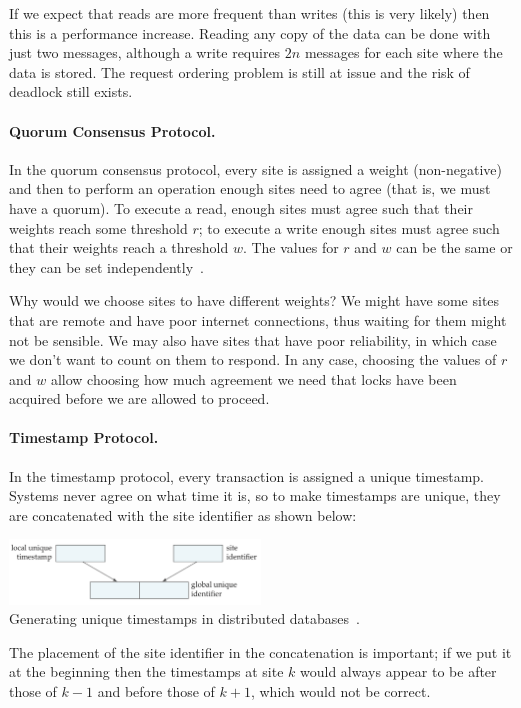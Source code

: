 If we expect that reads are more frequent than writes (this is very likely) then this is a performance increase. Reading any copy of the data can be done with just two messages, although a write requires $2n$ messages for each site where the data is stored. The request ordering problem is still at issue and the risk of deadlock still exists.

\paragraph{Quorum Consensus Protocol.} In the quorum consensus protocol, every site is assigned a weight (non-negative) and then to perform an operation enough sites need to agree (that is, we must have a quorum). To execute a read, enough sites must agree such that their weights reach some threshold $r$; to execute a write enough sites must agree such that their weights reach a threshold $w$. The values for $r$ and $w$ can be the same or they can be set independently~\cite{dsc}.

Why would we choose sites to have different weights? We might have some sites that are remote and have poor internet connections, thus waiting for them might not be sensible. We may also have sites that have poor reliability, in which case we don't want to count on them to respond. In any case, choosing the values of $r$ and $w$ allow choosing how much agreement we need that locks have been acquired before we are allowed to proceed.

\paragraph{Timestamp Protocol.} In the timestamp protocol, every transaction is assigned a unique timestamp. Systems never agree on what time it is, so to make timestamps are unique, they are concatenated with the site identifier as shown below:

\begin{center}
\includegraphics[width=0.5\textwidth]{images/ddb-timestamp}\\
Generating unique timestamps in distributed databases~\cite{dsc}.
\end{center}

The placement of the site identifier in the concatenation is important; if we put it at the beginning then the timestamps at site $k$ would always appear to be after those of $k-1$ and before those of $k+1$, which would not be correct. 

